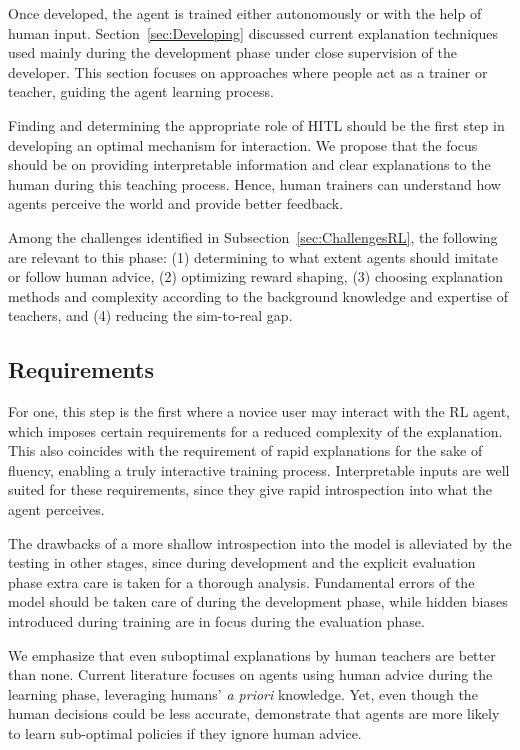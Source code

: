 \documentclass[twoside,11pt]{article}
\begin{document}
\begin{enumerate}

Once developed, the agent is trained either autonomously or with the help of human input. Section~\ref{sec:Developing} discussed current explanation techniques used mainly during the development phase under close supervision of the developer. This section focuses on approaches where people act as a trainer or teacher, guiding the agent learning process.

Finding and determining the appropriate role of HITL should be the first step in developing an optimal mechanism for interaction. We propose that the focus should be on providing interpretable information and clear explanations to the human during this teaching process. Hence, human trainers can understand how agents perceive the world and provide better feedback.

Among the challenges identified in Subsection~\ref{sec:ChallengesRL}, the following are relevant to this phase: (1) determining to what extent agents should imitate or follow human advice, (2) optimizing reward shaping,  (3) choosing explanation methods and complexity according to the background knowledge and expertise of teachers, and (4) reducing the sim-to-real gap. 

\subsection{Requirements}
For one, this step is the first where a novice user may interact with the RL agent, which imposes certain requirements for a reduced complexity of the explanation. This also coincides with the requirement of rapid explanations for the sake of fluency, enabling a truly interactive training process. Interpretable inputs are well suited for these requirements, since they give rapid introspection into what the agent perceives. 

The drawbacks of a more shallow introspection into the model is alleviated by the testing in other stages, since during development and the explicit evaluation phase extra care is taken for a thorough analysis. Fundamental errors of the model should be taken care of during the development phase, while hidden biases introduced during training are in focus during the evaluation phase.

We emphasize that even suboptimal explanations by human teachers are better than none. Current literature focuses on agents using human advice during the learning phase, leveraging humans' \emph{a priori} knowledge. Yet, even though the human decisions could be less accurate, \citet{Zhang:2020:human_out_loop} demonstrate that agents are more likely to learn sub-optimal policies if they ignore human advice. 


\end{enumerate}
\end{document}
